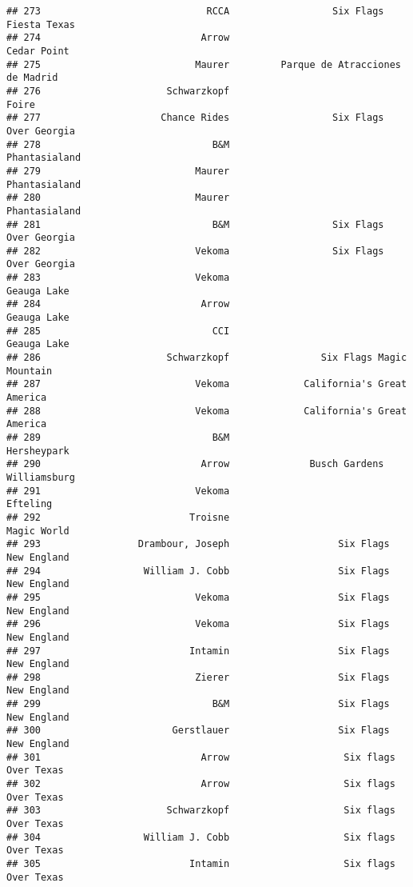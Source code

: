 \documentclass[
]{article}
\begin{document}
\begin{verbatim}
## 273                             RCCA                  Six Flags Fiesta Texas
## 274                            Arrow                             Cedar Point
## 275                           Maurer         Parque de Atracciones de Madrid
## 276                      Schwarzkopf                                   Foire
## 277                     Chance Rides                  Six Flags Over Georgia
## 278                              B&M                           Phantasialand
## 279                           Maurer                           Phantasialand
## 280                           Maurer                           Phantasialand
## 281                              B&M                  Six Flags Over Georgia
## 282                           Vekoma                  Six Flags Over Georgia
## 283                           Vekoma                             Geauga Lake
## 284                            Arrow                             Geauga Lake
## 285                              CCI                             Geauga Lake
## 286                      Schwarzkopf                Six Flags Magic Mountain
## 287                           Vekoma             California's Great America 
## 288                           Vekoma             California's Great America 
## 289                              B&M                             Hersheypark
## 290                            Arrow              Busch Gardens Williamsburg
## 291                           Vekoma                                Efteling
## 292                          Troisne                             Magic World
## 293                 Drambour, Joseph                   Six Flags New England
## 294                  William J. Cobb                   Six Flags New England
## 295                           Vekoma                   Six Flags New England
## 296                           Vekoma                   Six Flags New England
## 297                          Intamin                   Six Flags New England
## 298                           Zierer                   Six Flags New England
## 299                              B&M                   Six Flags New England
## 300                       Gerstlauer                   Six Flags New England
## 301                            Arrow                    Six flags Over Texas
## 302                            Arrow                    Six flags Over Texas
## 303                      Schwarzkopf                    Six flags Over Texas
## 304                  William J. Cobb                    Six flags Over Texas
## 305                          Intamin                    Six flags Over Texas

\end{verbatim}
\end{document}

